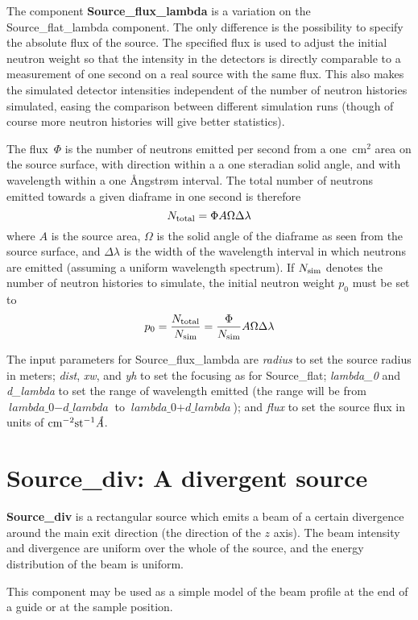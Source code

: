 The component {\bf Source\_flux\_lambda} is a variation on the
Source\_flat\_lambda component. The only difference is the possibility
to specify the absolute flux of the source. The specified flux is used
to adjust the initial neutron weight so that the intensity in the
detectors is directly comparable to a measurement of one second on a
real source with the same flux. This also makes the simulated detector
intensities independent of the number of neutron histories simulated,
easing the comparison between different simulation runs (though of
course more neutron histories will give better statistics).

The flux~$\Phi$ is the number of neutrons emitted per second from a
one~cm$^2$ area on the source surface, with direction within a a one
steradian solid angle, and with wavelength within a one {\AA}ngstr{\o}m
interval. The total number of neutrons emitted towards a given diaframe
in one second is therefore
$$ N_{\rm total} = \Phi A \Omega \Delta\lambda $$
where $A$ is the source area, $\Omega$ is the solid angle of the
diaframe as seen from the source surface, and $\Delta\lambda$ is the
width of the wavelength interval in which neutrons are emitted (assuming
a uniform wavelength spectrum). If $N_{\rm sim}$ denotes the number of
neutron histories to simulate, the initial neutron weight $p_0$ must be set to
$$ p_0 = \frac{N_{\rm total}}{N_{\rm sim}} = 
    \frac{\Phi}{N_{\rm sim}} A \Omega \Delta\lambda $$

The input parameters for Source\_flux\_lambda are \textit{radius} to set
the source radius in meters; \textit{dist}, \textit{xw}, and \textit{yh}
to set the focusing as for Source\_flat; \textit{lambda\_0} and
\textit{d\_lambda} to set the range of wavelength emitted (the range
will be from $\textit{lambda\_0} - \textit{d\_lambda}$ to
$\textit{lambda\_0} + \textit{d\_lambda}$); and \textit{flux} to set the
source flux in units of ${\rm cm}^{-2} {\rm st}^{-1} \textit{\AA}$.


\section{Source\_div: A divergent source}

{\bf Source\_div} is a rectangular source which emits a
beam of a certain divergence around the main exit direction
(the direction of the $z$ axis).
The beam intensity and divergence are uniform over
the whole of the source, and the energy distribution
of the beam is uniform.

This component may be used as a simple model of the
beam profile at the end of a guide or at the sample
position.

